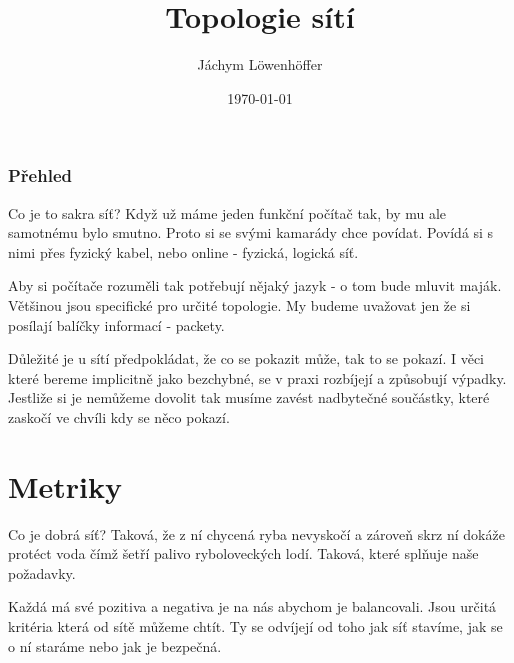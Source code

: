 \documentclass{beamer}
\title[počítačových lol]{Topologie sítí} %
\author{Jáchym Löwenhöffer} %
\institute[GEVO] %
{
Gravitaci Emulující Vágní Opar \\ %
\medskip
\textit{jachym.lowenhoffer@gmail.com} %
}
\date{\today} %
\begin{document}
\begin{frame}
	\titlepage %
\end{frame}

\begin{frame}
	\frametitle{Přehled} %
	\tableofcontents %
\end{frame}

\begin{frame}{Co je to sakra síť?}
 Když už máme jeden funkční počítač tak, by mu ale samotnému bylo smutno. Proto
 si se svými kamarády chce povídat. Povídá si s nimi přes fyzický kabel, nebo online -
 fyzická, logická síť.

 Aby si počítače rozuměli tak potřebují nějaký jazyk - o tom bude mluvit maják.
 Většinou jsou specifické pro určité topologie. My budeme uvažovat jen že si
 posílají balíčky informací - packety.
\vfill

Důležité je u sítí předpokládat, že co se pokazit může, tak to se pokazí. I věci
které bereme implicitně jako bezchybné, se v praxi rozbíjejí a způsobují výpadky.
Jestliže si je nemůžeme dovolit tak musíme zavést nadbytečné součástky, které zaskočí ve
chvíli kdy se něco pokazí.

 
\end{frame}


\section{Metriky}
\label{sec:metriky}

\begin{frame}{Co je dobrá síť?}
	Taková, že z ní chycená ryba nevyskočí a zároveň skrz ní dokáže protéct voda
	čímž šetří palivo ryboloveckých lodí.
	\vfill
	\centering
	\Large
	Taková, které splňuje naše požadavky.

	\normalsize
	\raggedright
	\vfill
	Každá má své pozitiva a negativa je na nás abychom je balancovali. Jsou určitá
	kritéria která od sítě můžeme chtít. Ty se odvíjejí od toho jak síť stavíme,
	jak se o ní staráme nebo jak je bezpečná.
\end{frame}
\end{document}
